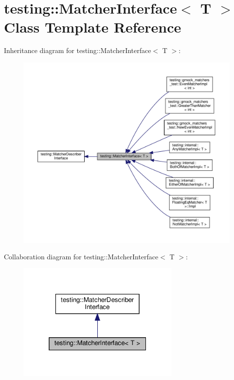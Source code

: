 \hypertarget{classtesting_1_1_matcher_interface}{}\section{testing\+:\+:Matcher\+Interface$<$ T $>$ Class Template Reference}
\label{classtesting_1_1_matcher_interface}


Inheritance diagram for testing\+:\+:Matcher\+Interface$<$ T $>$\+:
\nopagebreak
\begin{figure}[H]
\begin{center}
\leavevmode
\includegraphics[width=350pt]{classtesting_1_1_matcher_interface__inherit__graph}
\end{center}
\end{figure}


Collaboration diagram for testing\+:\+:Matcher\+Interface$<$ T $>$\+:
\nopagebreak
\begin{figure}[H]
\begin{center}
\leavevmode
\includegraphics[width=229pt]{classtesting_1_1_matcher_interface__coll__graph}
\end{center}
\end{figure}
